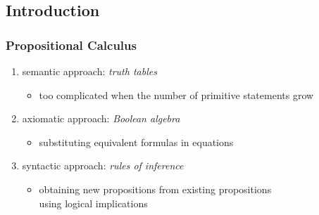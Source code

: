 \documentclass[dvipsnames]{beamer}
\begin{document}
\subsection{Introduction}

\begin{frame}
  \frametitle{Propositional Calculus}

  \begin{enumerate}
    \item semantic approach: \emph{truth tables}
    \begin{itemize}
      \item too complicated when the number of primitive statements grow
    \end{itemize}

    \pause
    \item axiomatic approach: \emph{Boolean algebra}
    \begin{itemize}
      \item substituting equivalent formulas in equations
    \end{itemize}

    \pause
    \item syntactic approach: \emph{rules of inference}
    \begin{itemize}
      \item obtaining new propositions from existing propositions\\
        using logical implications
    \end{itemize}
  \end{enumerate}
\end{frame}
\end{document}
